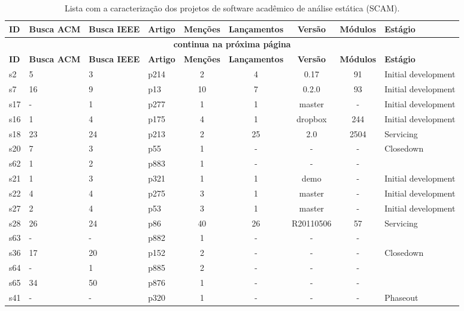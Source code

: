 \begin{longtable}{| l | l | l | l | c | c | c | c | l |}
  \caption{Lista com a caracterização dos projetos de software acadêmico de análise estática (SCAM).}
  \label{dataset-table} \\
  \hline
  \endfirsthead
  \hline
  \textbf{ID} & \textbf{Busca ACM} & \textbf{Busca IEEE} & \textbf{Artigo} & \textbf{Menções} & \textbf{Lançamentos} & \textbf{Versão} & \textbf{Módulos} & \textbf{Estágio} \\
  \hline
  \endhead
  \multicolumn{9}{c}{\textbf{continua na próxima página}} \\
  \hhline{---------} \endfoot
  \endlastfoot
  \textbf{ID} & \textbf{Busca ACM} & \textbf{Busca IEEE} & \textbf{Artigo} & \textbf{Menções} & \textbf{Lançamentos} & \textbf{Versão} & \textbf{Módulos} & \textbf{Estágio} \\
  \hline
s2 & 5 & 3 & p214 & 2 & 4 & 0.17 & 91 & Initial development \\
    \hline
s7 & 16 & 9 & p13 & 10 & 7 & 0.2.0 & 93 & Initial development \\
    \hline
s17 & - & 1 & p277 & 1 & 1 & master & - & Initial development \\
    \hline
s16 & 1 & 4 & p175 & 4 & 1 & dropbox & 244 & Initial development \\
    \hline
s18 & 23 & 24 & p213 & 2 & 25 & 2.0 & 2504 & Servicing \\
    \hline
s20 & 7 & 3 & p55 & 1 & - & - & - & Closedown \\
    \hline
s62 & 1 & 2 & p883 & 1 & - & - & - &  \\
    \hline
s21 & 1 & 3 & p321 & 1 & 1 & demo & - & Initial development \\
    \hline
s22 & 4 & 4 & p275 & 3 & 1 & master & - & Initial development \\
    \hline
s27 & 2 & 4 & p53 & 3 & 1 & master & - & Initial development \\
    \hline
s28 & 26 & 24 & p86 & 40 & 26 & R20110506 & 57 & Servicing \\
    \hline
s63 & - & - & p882 & 1 & - & - & - &  \\
    \hline
s36 & 17 & 20 & p152 & 2 & - & - & - & Closedown \\
    \hline
s64 & - & 1 & p885 & 2 & - & - & - &  \\
    \hline
s65 & 34 & 50 & p876 & 1 & - & - & - &  \\
    \hline
s41 & - & - & p320 & 1 & - & - & - & Phaseout \\

\end{longtable}
